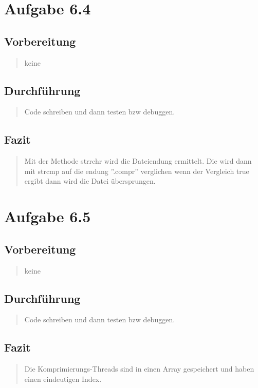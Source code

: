 \section{Aufgabe 6.4}
	\subsection{Vorbereitung}
		\begin{quote}
			keine\\
		\end{quote}
	\subsection{Durchführung}
		\begin{quote}
			Code schreiben und dann testen bzw debuggen.\\
		\end{quote}
	\subsection{Fazit}
	\begin{quote}
			\tiny
			Mit der Methode strrchr wird die Dateiendung ermittelt. Die wird dann mit strcmp auf die endung ''.compr'' verglichen wenn der Vergleich true ergibt dann wird die Datei \"ubersprungen.\\
	\end{quote}

\section{Aufgabe 6.5}
\subsection{Vorbereitung}
\begin{quote}
	keine\\
\end{quote}
\subsection{Durchführung}
\begin{quote}
	Code schreiben und dann testen bzw debuggen.\\
\end{quote}
\subsection{Fazit}
\begin{quote}
	Die Komprimierungs-Threads sind in einen Array gespeichert und haben einen eindeutigen Index.\\
\end{quote}

